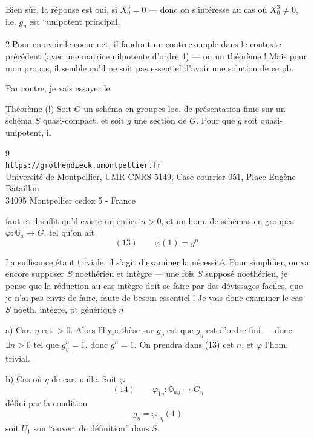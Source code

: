 Bien sûr, la  réponse est  oui, si $X_0^3=0$  --- donc on s'intéresse au cas où $X_0^3\ne0$, i.e.  $g_\eta$ est ``unipotent principal.

2.\quad Pour en avoir le coeur net, il faudrait un contreexemple dans le contexte précédent (avec une matrice nilpotente d'ordre 4) --- ou un théorème ! Mais pour mon propos, il semble qu'il ne soit pas essentiel d'avoir une solution de ce pb.

Par contre, je vais essayer le

\uline{Théorème} (!) Soit $G$ un schéma en groupes  loc. de présentation finie sur un schéma $S$ quasi-compact, et soit $g$ une section de $G$. Pour que $g$ soit quasi-unipotent, il

\begin{center}
\small
9\\
\texttt{https://grothendieck.umontpellier.fr}\\
Université de Montpellier, UMR CNRS 5149, Case courrier 051, Place Eugène Bataillon\\
34095 Montpellier cedex 5 - France
\end{center}
faut et il suffit qu'il existe un entier $n>0$, et un hom. de schémas en groupes $\varphi:\mathbb G_a\longrightarrow G$, tel qu'on ait
\[
(13)\qquad \varphi(1)=g^n.
\]

La suffisance étant triviale, il s'agit d'examiner la nécessité. Pour simplifier, on va encore supposer $S$ noethérien et intègre --- une fois $S$ supposé noethérien, je pense que la réduction au cas intègre doit se faire par des dévissages faciles, que je n'ai pas envie de faire, faute de besoin essentiel ! Je vais donc examiner le cas $S$ noeth. intègre, pt générique $\eta$

a) Car.  $\eta$ est $>0$. Alors  l'hypothèse sur $g_\eta$ est que $g_\eta$ est d'ordre fini --- donc $\exists n>0$ tel que $g_\eta^n=1$, donc $g^n=1$. On prendra dans (13) cet $n$, et $\varphi$ l'hom. trivial.

b) Cas où $\eta$ de car. nulle. Soit $\varphi$
\[
(14)\qquad \varphi_{1\eta}:\mathbb G_{a\eta}\longrightarrow G_\eta
\]
défini par la condition
\[
g_\eta=\varphi_{1\eta}(1)
\]
soit $U_1$ son ``ouvert de définition'' dans $S$.

